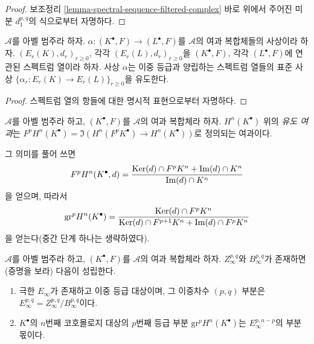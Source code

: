 \begin{proof}
보조정리 \ref{lemma-spectral-sequence-filtered-complex} 바로 위에서 주어진
미분 $d_1^{p, q}$의 식으로부터 자명하다.
\end{proof}

\begin{lemma}
\label{lemma-spectral-sequence-filtered-complex-functorial}
$\mathcal{A}$를 아벨 범주라 하자. $\alpha : (K^\bullet, F) \to
(L^\bullet, F)$를 $\mathcal{A}$의 여과 복합체들의 사상이라 하자.
$(E_r(K), d_r)_{r \geq 0}$, 각각 $(E_r(L), d_r)_{r \geq 0}$을
$(K^\bullet, F)$, 각각 $(L^\bullet, F)$에 연관된 스펙트럼 열이라 하자.
사상 $\alpha$는 이중 등급과 양립하는 스펙트럼 열들의 표준 사상
$\{\alpha_r : E_r(K) \to E_r(L)\}_{r \geq 0}$을 유도한다.
\end{lemma}

\begin{proof}
스펙트럼 열의 항들에 대한 명시적 표현으로부터 자명하다.
\end{proof}

\begin{definition}
\label{definition-filtration-cohomology-filtered-complex}
$\mathcal{A}$를 아벨 범주라 하고, $(K^\bullet, F)$를 $\mathcal{A}$의
여과 복합체라 하자. $H^n(K^\bullet)$ 위의 {\it 유도 여과}는
$F^pH^n(K^\bullet) = \Im(H^n(F^pK^\bullet) \to H^n(K^\bullet))$로
정의되는 여과이다.
\end{definition}

\noindent
그 의미를 풀어 쓰면
\begin{equation}
\label{equation-filtration-cohomology}
F^pH^n(K^\bullet, d) =
\frac{\mathop{\mathrm{Ker}}(d) \cap F^pK^n + \mathop{\mathrm{Im}}(d) \cap K^n}{\mathop{\mathrm{Im}}(d) \cap K^n}
\end{equation}
을 얻으며, 따라서
\begin{equation}
\label{equation-graded-cohomology}
\text{gr}^p H^n(K^\bullet) =
\frac{\mathop{\mathrm{Ker}}(d) \cap F^pK^n}{\mathop{\mathrm{Ker}}(d) \cap F^{p + 1}K^n + \mathop{\mathrm{Im}}(d) \cap F^pK^n}
\end{equation}
을 얻는다(중간 단계 하나는 생략하였다).

\begin{lemma}
\label{lemma-compute-cohomology-filtered-complex}
$\mathcal{A}$를 아벨 범주라 하고, $(K^\bullet, F)$를 $\mathcal{A}$의
여과 복합체라 하자. $Z_\infty^{p, q}$와 $B_\infty^{p, q}$가 존재하면
(증명을 보라) 다음이 성립한다.
\begin{enumerate}
\item 극한 $E_\infty$가 존재하고 이중 등급 대상이며, 그 이중차수
$(p, q)$ 부분은 $E_\infty^{p, q} = Z_\infty^{p, q}/B_\infty^{p, q}$이다.
\item $K^\bullet$의 $n$번째 코호몰로지 대상의 $p$번째 등급 부분
$\text{gr}^pH^n(K^\bullet)$는 $E_\infty^{p, n - p}$의 부분몫이다.
\end{enumerate}
\end{lemma}

